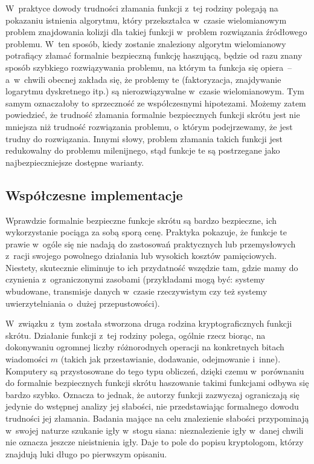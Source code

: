 W~praktyce dowody trudności złamania funkcji z~tej rodziny polegają na
pokazaniu istnienia algorytmu, który przekształca w~czasie wielomianowym
problem znajdowania kolizji dla takiej funkcji w~problem rozwiązania źródłowego
problemu. W~ten sposób, kiedy zostanie znaleziony algorytm wielomianowy
potrafiący złamać formalnie bezpieczną funkcję haszującą, będzie od razu znany sposób
szybkiego rozwiązywania problemu, na którym ta funkcja się opiera~-- a~w~chwili
obecnej zakłada się, że problemy te (faktoryzacja, znajdywanie logarytmu
dyskretnego itp.) są nierozwiązywalne w~czasie wielomianowym. Tym samym
oznaczałoby to sprzeczność ze współczesnymi hipotezami. Możemy zatem
powiedzieć, że trudność złamania formalnie bezpiecznych funkcji skrótu jest nie
mniejsza niż trudność rozwiązania problemu, o~którym podejrzewamy, że jest
trudny do rozwiązania. Innymi słowy, problem złamania takich funkcji jest
redukowalny do problemu milenijnego, stąd funkcje te są postrzegane jako
najbezpieczniejsze dostępne warianty.



\subsection{Współczesne implementacje}
Wprawdzie formalnie bezpieczne funkcje skrótu są bardzo bezpieczne, ich
wykorzystanie pociąga za sobą sporą cenę. Praktyka pokazuje, że funkcje te prawie w~ogóle się
nie nadają do zastosowań praktycznych lub przemysłowych z~racji swojego powolnego
działania lub wysokich kosztów pamięciowych. Niestety, skutecznie eliminuje to
ich przydatność wszędzie tam, gdzie mamy do czynienia z~ograniczonymi zasobami
(przykładami mogą być: systemy wbudowane, transmisje danych w~czasie
rzeczywistym czy też systemy uwierzytelniania o~dużej przepustowości).

W~związku z~tym została stworzona druga rodzina kryptograficznych funkcji
skrótu. Działanie funkcji z~tej rodziny polega, ogólnie rzecz biorąc, na
dokonywaniu ogromnej liczby różnorodnych operacji na konkretnych bitach
wiadomości $m$ (takich jak przestawianie, dodawanie, odejmowanie i~inne).
Komputery są przystosowane do tego typu obliczeń, dzięki czemu w~porównaniu do
formalnie bezpiecznych funkcji skrótu haszowanie takimi funkcjami odbywa się
bardzo szybko. Oznacza to jednak, że autorzy funkcji zazwyczaj ograniczają się
jedynie do wstępnej analizy jej słabości,  nie przedstawiając
formalnego dowodu trudności jej złamania. Badania mające na celu znalezienie
słabości przypominają w~swojej naturze szukanie igły w~stogu siana:
nieznalezienie igły w~danej chwili nie oznacza jeszcze nieistnienia igły. Daje
to pole do popisu kryptologom, którzy znajdują luki długo po pierwszym
opisaniu.



